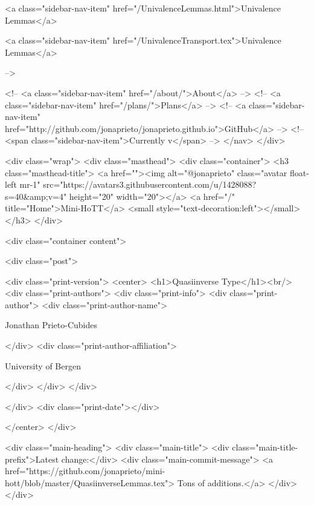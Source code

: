       
    
      
        
          <a class="sidebar-nav-item" href="/UnivalenceLemmas.html">Univalence Lemmas</a>
        
      
    
      
        
          <a class="sidebar-nav-item" href="/UnivalenceTransport.tex">Univalence Lemmas</a>
        
      
     -->

    <!-- <a class="sidebar-nav-item" href="/about/">About</a> -->
    <!-- <a class="sidebar-nav-item" href="/plans/">Plans</a> -->
    <!-- <a class="sidebar-nav-item" href="http://github.com/jonaprieto/jonaprieto.github.io">GitHub</a> -->
    <!-- <span class="sidebar-nav-item">Currently v</span> -->
  </nav>
</div>

    <div class="wrap">
      <div class="masthead">
        <div class="container">
          <h3 class="masthead-title">
            <a href=""><img alt="@jonaprieto" class="avatar float-left mr-1" src="https://avatars3.githubusercontent.com/u/1428088?s=40&amp;v=4" height="20" width="20"></a>
            <a href="/" title="Home">Mini-HoTT</a>
            <small style="text-decoration:left"></small>
          </h3>
        </div>
      
      <div class="container content">
        







<div class="post">

  <div class="print-version">
    <center>
      <h1>Quasiinverse Type</h1><br/>
        <div class="print-authors">
          <div class="print-info">
            <div class="print-author">
              <div class="print-author-name">
                
                  Jonathan Prieto-Cubides
                
              </div>
              <div class="print-author-affiliation">
                
                  University of Bergen
                
                </div>
            </div>
          </div>
          
          
        </div>
        <div class="print-date"></div>
        
        
    </center>
  </div>

  
  <div class="main-heading">
    <div class="main-title">
      <div class="main-title-prefix">Latest change:</div>
      <div class="main-commit-message">
            <a href="https://github.com/jonaprieto/mini-hott/blob/master/QuasiinverseLemmas.tex">
              Tons of additions.</a>
      </div>
    </div>


